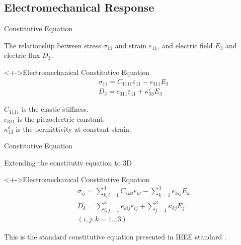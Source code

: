 \documentclass{beamer}
\begin{document}
\subsection{Electromechanical Response} 

\begin{frame}{Constitutive Equation} 

The relationship between stress $\sigma_{11}$ and
strain $\varepsilon_{11}$, and electric field $E_3$ and electric flux $D_3$.
\begin{block}<+->{Electromechanical Constitutive Equation}
\begin{equation}
\begin{aligned}
&\sigma_{11}=C_{1111} \varepsilon_{11}-e_{311} E_{3} \\
&D_3=e_{311} \varepsilon_{11}+\kappa_{33}^\varepsilon E_{3}
\end{aligned}
\label{stress_1D_const_eqn_beam:EQN}
\end{equation}
\end{block}

$C_{1111}$ is the elastic stiffness. \\
$e_{311}$ is the piezoelectric constant. \\
$\kappa_{33}^\varepsilon$ is the permittivity at constant strain. \\

\end{frame}


\begin{frame}{Constitutive Equation} 

Extending the constitutiv equation to 3D
\begin{block}<+->{Electromechanical Constitutive Equation}
\begin{equation}
\begin{aligned}
&\sigma _{ij} = 
\sum_{k,l=1}^3 {C_{ijkl}}{\varepsilon _{kl}} - 
\sum_{k=1}^3 {e_{kij}}{E_k}\\
&{D_k} = 
\sum_{i,j=1}^3 e_{kij}\varepsilon _{ij} + 
\sum_{j=1}^3 \kappa _{kj}{E_j}\\
& (i,j,k=1 \dots 3)
\end{aligned}
\label{EQN:Standanrd_Constitutive_Relation} 
\end{equation}
\end{block}
This is the standard constitutive equation presented in IEEE standard
\cite{meitzler1988ieee}.
\end{frame}
\end{document}
